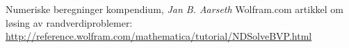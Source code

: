 \begin{thebibliography}{1}
   Numeriske beregninger kompendium, \emph{Jan B. Aarseth}
   Wolfram.com artikkel om løsing av randverdiproblemer: \\ \url{http://reference.wolfram.com/mathematica/tutorial/NDSolveBVP.html}
\end{thebibliography}
